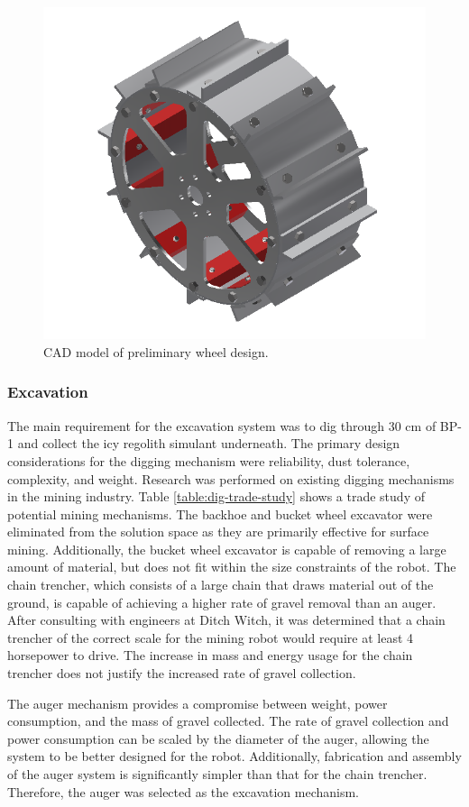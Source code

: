 \documentclass[class=article, crop=false]{standalone}
\begin{document}
	\FloatBarrier
		\begin{figure}[h]
			\centering
			\includegraphics[width=0.4\linewidth]{09_Figures/wheel-cad-preliminary.jpg}
			\caption{CAD model of preliminary wheel design.}
			\label{fig:cad-wheel-prelim}
		\end{figure}
		\FloatBarrier

	\subsubsection{Excavation}
The main requirement for the excavation system was to dig through 30 cm of BP-1 and collect the icy regolith simulant underneath. The primary design considerations for the digging mechanism were reliability, dust tolerance, complexity, and weight. 
Research was performed on existing digging mechanisms in the mining industry. Table \ref{table:dig-trade-study} shows a trade study of potential mining mechanisms. The backhoe and bucket wheel excavator were eliminated from the solution space as they are primarily effective for surface mining. Additionally, the bucket wheel excavator is capable of removing a large amount of material, but does not fit within the size constraints of the robot.
The chain trencher, which consists of a large chain that draws material out of the ground, is capable of achieving a higher rate of gravel removal than an auger. After consulting with engineers at Ditch Witch, it was determined that a chain trencher of the correct scale for the mining robot would require at least 4 horsepower to drive. The increase in mass and energy usage for the chain trencher does not justify the increased rate of gravel collection.

The auger mechanism provides a compromise between weight, power consumption, and the mass of gravel collected. The rate of gravel collection and power consumption can be scaled by the diameter of the auger, allowing the system to be better designed for the robot. Additionally, fabrication and assembly of the auger system is significantly simpler than that for the chain trencher. Therefore, the auger was selected as the excavation mechanism.
\end{document}

